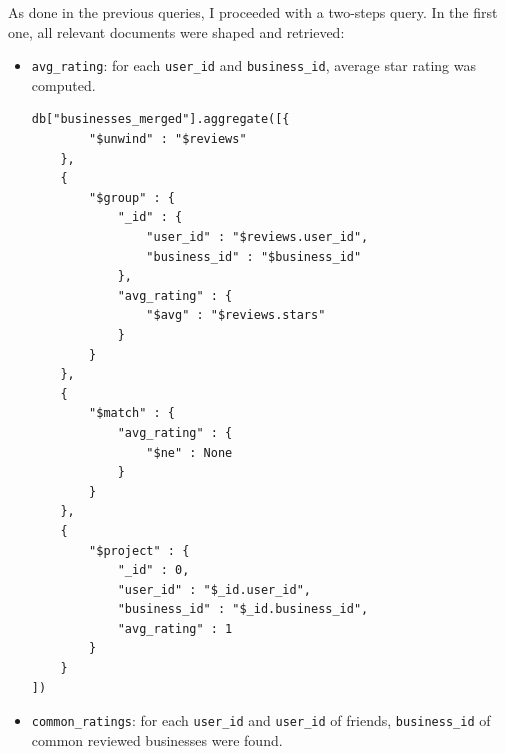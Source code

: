 \documentclass{Configuration_Files/PoliMi3i_thesis}
\begin{document}
As done in the previous queries, I proceeded with a two-steps query. In the first one, all relevant documents were shaped and retrieved:
\begin{itemize}
    \item \texttt{avg\_rating}: for each \texttt{user\_id} and \texttt{business\_id}, average star rating was computed. 

\bigskip

\begin{lstlisting}[style = mongodb]
db["businesses_merged"].aggregate([{
        "$unwind" : "$reviews"
    },
    {
        "$group" : {
            "_id" : {
                "user_id" : "$reviews.user_id",
                "business_id" : "$business_id"
            },
            "avg_rating" : {
                "$avg" : "$reviews.stars"
            }
        }
    },
    {
        "$match" : {
            "avg_rating" : {
                "$ne" : None
            }
        }
    },
    {
        "$project" : {
            "_id" : 0,
            "user_id" : "$_id.user_id",
            "business_id" : "$_id.business_id",
            "avg_rating" : 1
        }
    }
])
\end{lstlisting}

\bigskip

\item \texttt{common\_ratings}: for each \texttt{user\_id} and \texttt{user\_id} of friends, \texttt{business\_id} of common reviewed businesses were found. 

\bigskip


\end{itemize}
\end{document}
